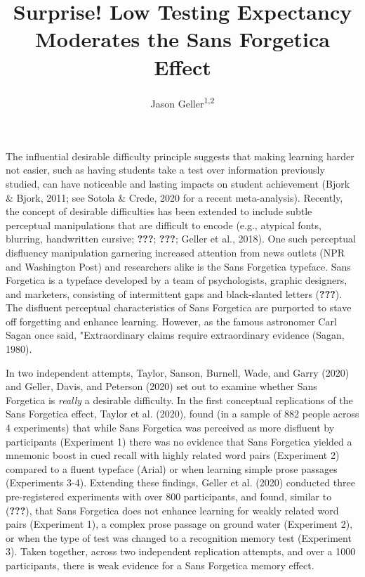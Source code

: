 \documentclass[
  english,
  man]{apa6}
\title{Surprise! Low Testing Expectancy Moderates the Sans Forgetica Effect}
\author{Jason Geller\textsuperscript{1,2}}
\date{}
\affiliation{\vspace{0.5cm}\textsuperscript{1} University of Iowa\\\textsuperscript{2} Rutgers University Center for Cognitive Science}
\begin{document}
\maketitle

The influential desirable difficulty principle suggests that making learning harder not easier, such as having students take a test over information previously studied, can have noticeable and lasting impacts on student achievement (Bjork \& Bjork, 2011; see Sotola \& Crede, 2020 for a recent meta-analysis). Recently, the concept of desirable difficulties has been extended to include subtle perceptual manipulations that are difficult to encode (e.g., atypical fonts, blurring, handwritten cursive; {\textbf{???}}; {\textbf{???}}; Geller et al., 2018). One such perceptual disfluency manipulation garnering increased attention from news outlets (NPR and Washington Post) and researchers alike is the Sans Forgetica typeface. Sans Forgetica is a typeface developed by a team of psychologists, graphic designers, and marketers, consisting of intermittent gaps and black-slanted letters ({\textbf{???}}). The disfluent perceptual characteristics of Sans Forgetica are purported to stave off forgetting and enhance learning. However, as the famous astronomer Carl Sagan once said, "Extraordinary claims require extraordinary evidence (Sagan, 1980).

In two independent attempts, Taylor, Sanson, Burnell, Wade, and Garry (2020) and Geller, Davis, and Peterson (2020) set out to examine whether Sans Forgetica is \emph{really} a desirable difficulty. In the first conceptual replications of the Sans Forgetica effect, Taylor et al. (2020), found (in a sample of 882 people across 4 experiments) that while Sans Forgetica was perceived as more disfluent by participants (Experiment 1) there was no evidence that Sans Forgetica yielded a mnemonic boost in cued recall with highly related word pairs (Experiment 2) compared to a fluent typeface (Arial) or when learning simple prose passages (Experiments 3-4). Extending these findings, Geller et al. (2020) conducted three pre-registered experiments with over 800 participants, and found, similar to ({\textbf{???}}), that Sans Forgetica does not enhance learning for weakly related word pairs (Experiment 1), a complex prose passage on ground water (Experiment 2), or when the type of test was changed to a recognition memory test (Experiment 3). Taken together, across two independent replication attempts, and over a 1000 participants, there is weak evidence for a Sans Forgetica memory effect.
\end{document}
